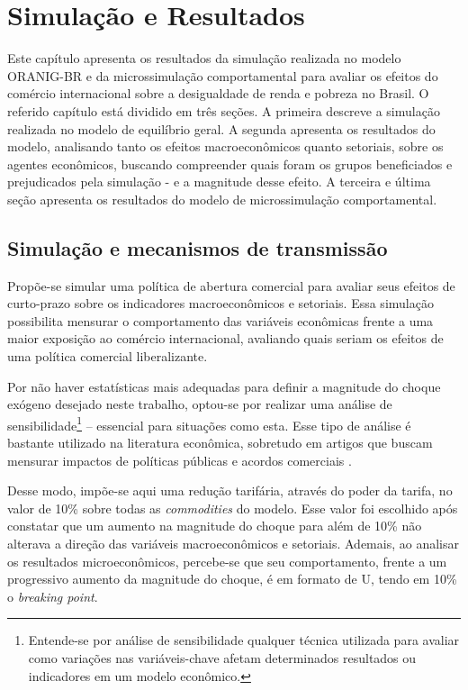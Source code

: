 

\chapter{Simulação e Resultados} \label{cha:resultados}

Este capítulo apresenta os resultados da simulação realizada no modelo ORANIG-BR e da microssimulação comportamental para avaliar os efeitos do comércio internacional sobre a desigualdade de renda e pobreza no Brasil. O referido capítulo está dividido em três seções. A primeira descreve a simulação realizada no modelo de equilíbrio geral. A segunda apresenta os resultados do modelo, analisando tanto os efeitos macroeconômicos quanto setoriais, sobre os agentes econômicos, buscando compreender quais foram os grupos beneficiados e prejudicados pela simulação - e a magnitude desse efeito. A terceira e última seção apresenta os resultados do modelo de microssimulação comportamental.



\section{Simulação e mecanismos de transmissão} \label{sec:simulacao}

Propõe-se simular uma política de abertura comercial para avaliar seus efeitos de curto-prazo sobre os indicadores macroeconômicos e setoriais. Essa simulação possibilita mensurar o comportamento das variáveis econômicas frente a uma maior exposição ao comércio internacional, avaliando quais seriam os efeitos de uma política comercial liberalizante.

Por não haver estatísticas mais adequadas para definir a magnitude do choque exógeno desejado neste trabalho, optou-se por realizar uma análise de sensibilidade\footnote{Entende-se por análise de sensibilidade qualquer técnica utilizada para avaliar como variações nas variáveis-chave afetam determinados resultados ou indicadores em um modelo econômico.} -- essencial para situações como esta. Esse tipo de análise é bastante utilizado na literatura econômica, sobretudo em artigos que buscam mensurar impactos de políticas públicas e acordos comerciais \cite{haddad05, domingues08,perobelli17}.

Desse modo, impõe-se aqui uma redução tarifária, através do poder da tarifa, no valor de 10\% sobre todas as \textit{commodities} do modelo. Esse valor foi escolhido após constatar que um aumento na magnitude do choque para além de 10\% não alterava a direção das variáveis macroeconômicos e setoriais. Ademais, ao analisar os resultados microeconômicos, percebe-se que seu comportamento, frente a um progressivo aumento da magnitude do choque, é em formato de U, tendo em 10\% o \textit{breaking point}.

